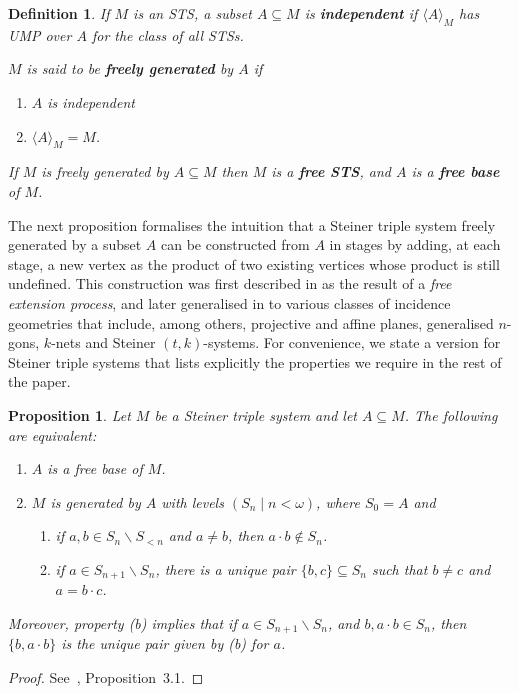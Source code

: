 \documentclass[a4paper, 11pt]{article}
\theoremstyle{note}
\newtheorem{df}[thm]{Definition}
\newtheorem{prop}[thm]{Proposition}
\begin{document}
 \begin{df} If $M$ is an STS, a subset $A \subseteq M$ is \textbf{independent} if $\langle A \rangle_M$ has UMP  over $A$ for the class of all STSs.

$M$ is  said to be \textbf{freely generated} by $A$ if
\begin{enumerate}
\item[(i)] $A$ is independent
\item[(ii)] $\langle A \rangle_M = M$.
\end{enumerate}

If $M$ is freely generated by $A \subseteq M$ then $M$ is a \textbf{free STS}, and $A$ is a \textbf{free base} of $M$.

\end{df}
 
		
	The next proposition formalises the intuition that a Steiner triple system freely generated by a subset $A$ can be constructed from $A$ in stages by adding, at each stage, a new vertex as the product of two existing vertices whose product is still undefined. This construction was first described in \cite{sieben} as the result of a \textit{free extension process}, and later generalised in \cite{funk} to various classes of incidence geometries that include, among others, projective and affine planes, generalised $n$-gons, $k$-nets and Steiner $(t,k)$-systems.  For convenience, we state a version for Steiner triple systems that lists explicitly the properties we require in the rest of the paper.
	
	
	\begin{prop}\label{May12_2} Let  $M$ be a Steiner triple system and let $A\subseteq M$. The following are equivalent:
		\begin{enumerate}
			\item $A$ is a free base of $M$.
			\item $M$ is generated by $A$ with levels $(S_n\mid n<\omega)$, where $S_0=A$ and
			\begin{enumerate}
				\item if $a,b\in S_n\smallsetminus S_{<n}$ and $a\neq b$, then $a\cdot b\not\in S_n$.
				\item if $a\in S_{n+1}\smallsetminus S_n$, there is a unique pair $\{b,c\}\subseteq S_n$ such that $b\neq c$ and $a= b\cdot c$.
			\end{enumerate}
		\end{enumerate}
		Moreover, property (b) implies that if  $a\in S_{n+1}\smallsetminus S_n$, and $b, a\cdot b\in S_n$, then  $\{b,a\cdot b\}$ is the unique pair given by (b) for  $a$.
	\end{prop}
	\begin{proof} See~\cite{barcas2},  Proposition~3.1.
	\end{proof}
\end{document}
